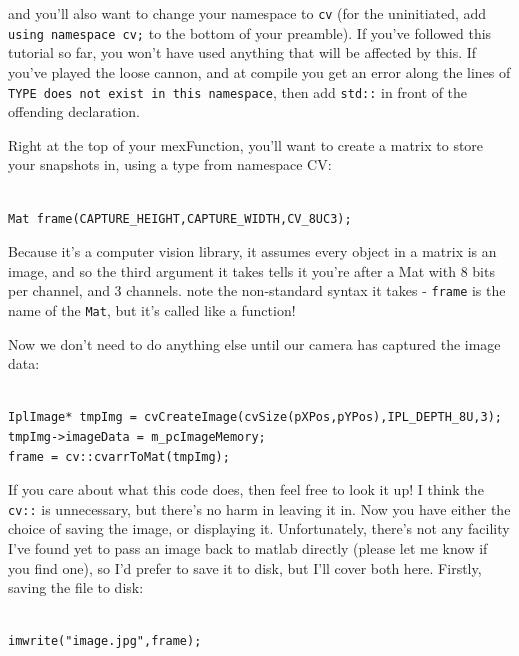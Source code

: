 \documentclass[12pt,a4paper]{article}
\begin{document}
and you'll also want to change your namespace to \texttt{cv} (for the uninitiated, add \texttt{using namespace cv;} to the bottom of your preamble). If you've followed this tutorial so far, you won't have used anything that will be affected by this. If you've played the loose cannon, and at compile you get an error along the lines of \texttt{TYPE does not exist in this namespace}, then add \texttt{std::} in front of the offending declaration.

Right at the top of your mexFunction, you'll want to create a matrix to store your snapshots in, using a type from namespace CV:

\lstset{language=C++}
\begin{lstlisting}

Mat frame(CAPTURE_HEIGHT,CAPTURE_WIDTH,CV_8UC3);

\end{lstlisting}

Because it's a computer vision library, it assumes every object in a matrix is an image, and so the third argument it takes tells it you're after a Mat with 8 bits per channel, and 3 channels. note the non-standard syntax it takes - \texttt{frame} is the name of the \texttt{Mat}, but it's called like a function!

Now we don't need to do anything else until our camera has captured the image data:

\lstset{language=C++}
\begin{lstlisting}

IplImage* tmpImg = cvCreateImage(cvSize(pXPos,pYPos),IPL_DEPTH_8U,3); 
tmpImg->imageData = m_pcImageMemory;
frame = cv::cvarrToMat(tmpImg);

\end{lstlisting}

If you care about what this code does, then feel free to look it up! I think the \texttt{cv::} is unnecessary, but there's no harm in leaving it in. Now you have either the choice of saving the image, or displaying it. Unfortunately, there's not any facility I've found yet to pass an image back to matlab directly (please let me know if you find one), so I'd prefer to save it to disk, but I'll cover both here. Firstly, saving the file to disk:

\lstset{language=C++}
\begin{lstlisting}

imwrite("image.jpg",frame);

\end{lstlisting}
\end{document}
